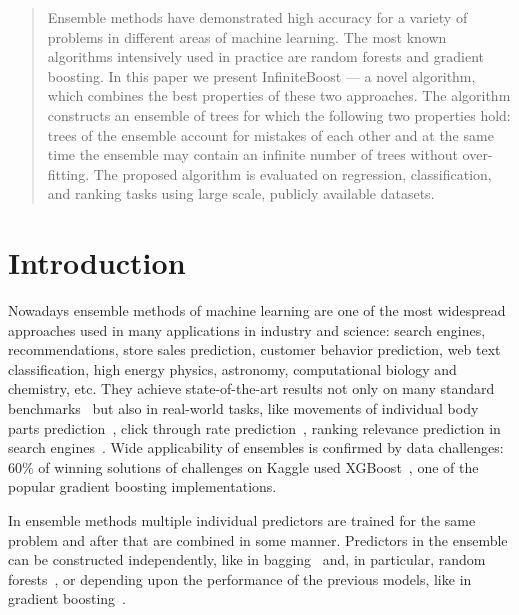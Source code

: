 \begin{abstract}
    Ensemble methods have demonstrated high accuracy for a variety of problems in different areas of machine learning.
    The most known algorithms intensively used in practice are random forests and gradient boosting.
    In this paper we present InfiniteBoost --- a novel algorithm, which combines the best properties of these two approaches. 
    The algorithm constructs an ensemble of trees for which the following two properties hold: trees of the ensemble account for mistakes of each other and at the same time the ensemble may contain an infinite number of trees without over-fitting.
    The proposed algorithm is evaluated on regression, classification, and ranking tasks using large scale, publicly available datasets.
\end{abstract}

\section{Introduction}

Nowadays ensemble methods of machine learning are one of the most widespread approaches used in many applications in industry and science:
search engines, recommendations, store sales prediction, customer behavior prediction, web text classification, high energy physics, astronomy, computational biology and chemistry, etc.
They achieve state-of-the-art results not only on many standard benchmarks~\cite{key-benchmarks,key-benchmarks-forest} but also in real-world tasks, like movements of individual body parts prediction~\cite{key-kinect}, click through rate prediction~\cite{key-facebook}, ranking relevance prediction in search engines~\cite{key-yahoo}. 
Wide applicability of ensembles is confirmed by data challenges: 60\% of winning solutions of challenges on Kaggle used XGBoost~\cite{key-xgboost}, one of the popular gradient boosting implementations. 

In ensemble methods multiple individual predictors are trained for the same problem and after that are combined in some manner.
Predictors in the ensemble can be constructed independently, like in bagging~\cite{key-bagging} and, in particular, random forests~\cite{key-random-forest}, or depending upon the performance of the previous models, like in gradient boosting~\cite{key-gb}.

